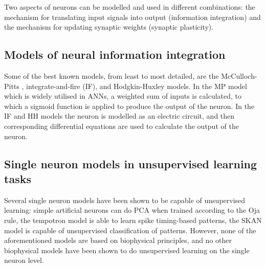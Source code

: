 \documentclass[a4paper,12pt]{report}
\theoremstyle{definition}
\begin{document}
Two aspects of neurons can be modelled and used in different combinations: the mechanism for translating input signals into output (information integration) and the mechanism for updating synaptic weights (synaptic plasticity).


\subsection{Models of neural information integration}
\label{modelsofintegration}

Some of the best known models, from least to most detailed, are the McCulloch-Pitts \cite{mcculloch1943logical}, integrate-and-fire (IF), and Hodgkin-Huxley \cite{hodgkin1952quantitative} models. In the MP model which is widely utilised in ANNs, a weighted sum of inputs is calculated, to which a sigmoid function is applied to produce the output of the neuron. In the IF and HH models the neuron is modelled as an electric circuit, and then corresponding differential equations are used to calculate the output of the neuron.





\subsection{Single neuron models in unsupervised learning tasks}

Several single neuron models have been shown to be capable of unsupervised learning: simple artificial neurons can do PCA when trained according to the Oja rule, the tempotron model \cite{gutig2006tempotron} is able to learn spike timing-based patterns, the SKAN model \cite{afshar2014racing} is capable of unsupervised classification of patterns. However, none of the aforementioned models are based on biophysical principles, and no other biophysical models have been shown to do unsupervised learning on the single neuron level.
\end{document}
